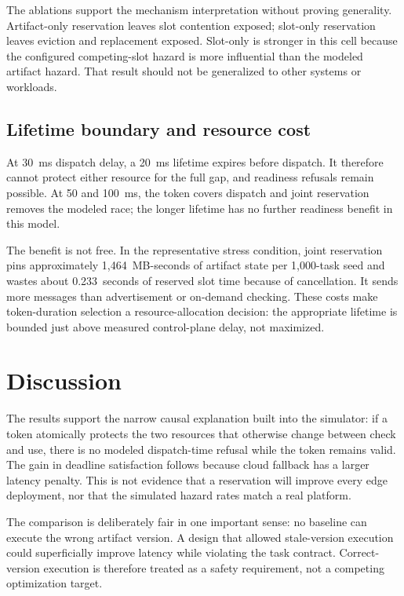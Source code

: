 \documentclass[11pt,a4paper]{article}
\begin{document}
The ablations support the mechanism interpretation without proving generality. Artifact-only reservation leaves slot contention exposed; slot-only reservation leaves eviction and replacement exposed. Slot-only is stronger in this cell because the configured competing-slot hazard is more influential than the modeled artifact hazard. That result should not be generalized to other systems or workloads.

\subsection{Lifetime boundary and resource cost}

At 30~ms dispatch delay, a 20~ms lifetime expires before dispatch. It therefore cannot protect either resource for the full gap, and readiness refusals remain possible. At 50 and 100~ms, the token covers dispatch and joint reservation removes the modeled race; the longer lifetime has no further readiness benefit in this model.

The benefit is not free. In the representative stress condition, joint reservation pins approximately 1,464~MB-seconds of artifact state per 1,000-task seed and wastes about 0.233~seconds of reserved slot time because of cancellation. It sends more messages than advertisement or on-demand checking. These costs make token-duration selection a resource-allocation decision: the appropriate lifetime is bounded just above measured control-plane delay, not maximized.

\section{Discussion}

The results support the narrow causal explanation built into the simulator: if a token atomically protects the two resources that otherwise change between check and use, there is no modeled dispatch-time refusal while the token remains valid. The gain in deadline satisfaction follows because cloud fallback has a larger latency penalty. This is not evidence that a reservation will improve every edge deployment, nor that the simulated hazard rates match a real platform.

The comparison is deliberately fair in one important sense: no baseline can execute the wrong artifact version. A design that allowed stale-version execution could superficially improve latency while violating the task contract. Correct-version execution is therefore treated as a safety requirement, not a competing optimization target.
\end{document}
